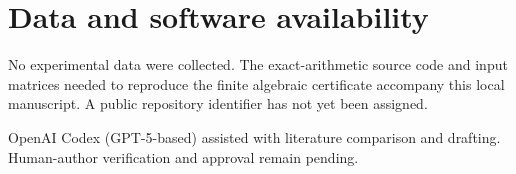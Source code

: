 \documentclass[aps,pra,reprint,onecolumn,superscriptaddress]{revtex4-2}
\begin{document}
\section*{Data and software availability}
No experimental data were collected. The exact-arithmetic source code and input matrices needed to reproduce the finite algebraic certificate accompany this local manuscript. A public repository identifier has not yet been assigned.

\begin{acknowledgments}
OpenAI Codex (GPT-5-based) assisted with literature comparison and drafting. Human-author verification and approval remain pending.
\end{acknowledgments}



\end{document}
